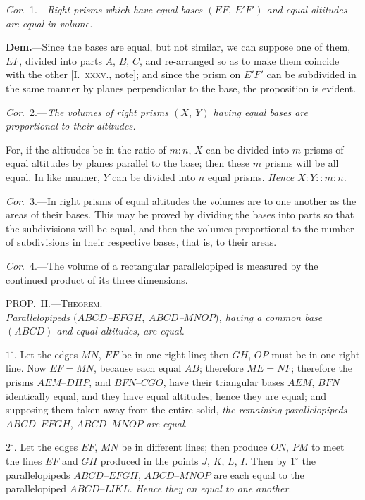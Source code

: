 \documentclass[oneside]{book}
\newcommand\myprop[2]{
\bigskip\Needspace*{4\baselineskip}\begin{center}\textsc{#1}\\\medskip\emph{#2}\par\end{center}
}
\newcommand\imgcent[2]{
\begin{center}
\end{center}
}
\begin{document}
\textit{Cor}.~1.---\textit{Right prisms which have equal bases $(EF,\ E'F')$
and equal altitudes are equal in volume.}

\imgcent{213}{f237}

\textbf{Dem.}---Since the bases are equal, but not similar, we
can suppose one of them, $EF$, divided into parts $A$, $B$, $C$,
and re-arranged so as to make them coincide with the
other [I.~\textsc{xxxv.}, note]; and since the prism on $E'F'$ can
be subdivided in the same manner by planes perpendicular
to the base, the proposition is evident.

\textit{Cor}.~2.---\textit{The volumes of right prisms $(X,\ Y)$ having
equal bases are proportional to their altitudes.}

For, if the altitudes be in the ratio of $m : n$, $X$ can
be divided into $m$ prisms of equal altitudes by planes
parallel to the base; then these $m$ prisms will be all
equal. In like manner, $Y$ can be divided into $n$ equal
prisms. \textit{Hence $X : Y :: m : n$.}

\textit{Cor}.~3.---In right prisms of equal altitudes the
volumes are to one another as the areas of their bases.
This may be proved by dividing the bases into parts
so that the subdivisions will be equal, and then the
volumes proportional to the number of subdivisions in
their respective bases, that is, to their areas.

\textit{Cor}.~4.---The volume of a rectangular parallelopiped
is measured by the continued product of its three dimensions.

\myprop{PROP\@.~II\@.---Theorem.}{Parallelopipeds $(ABCD$--$EFGH,\ ABCD$--$MNOP)$, having
a common base $(ABCD)$ and equal altitudes, are equal.}

\imgcent{250}{f238}

$1^\circ$. Let the edges $MN$, $EF$ be in one right line; then
$GH$, $OP$ must be in one right line. Now $EF = MN$,
because each equal $AB$; therefore $ME=NF$; therefore
the prisms $AEM$--$DHP$, and $BFN$--$CGO$, have their
triangular bases $AEM$, $BFN$ identically equal, and
they have equal altitudes; hence they are equal; and
supposing them taken away from the entire solid, \emph{the
remaining parallelopipeds} $ABCD$--$EFGH$, $ABCD$--$MNOP$
\emph{are equal}.

\imgcent{280}{f239}

$2^{\circ}$. Let the edges $EF$, $MN$ be in different lines;
then produce $ON$, $PM$ to meet the lines $EF$ and $GH$
produced in the points $J$, $K$, $L$, $I$. Then by $1^{\circ}$ the
parallelopipeds $ABCD$--$EFGH$, $ABCD$--$MNOP$ are each
equal to the parallelopiped $ABCD$--$IJKL$. \emph{Hence they
an equal to one another}.
\end{document}
